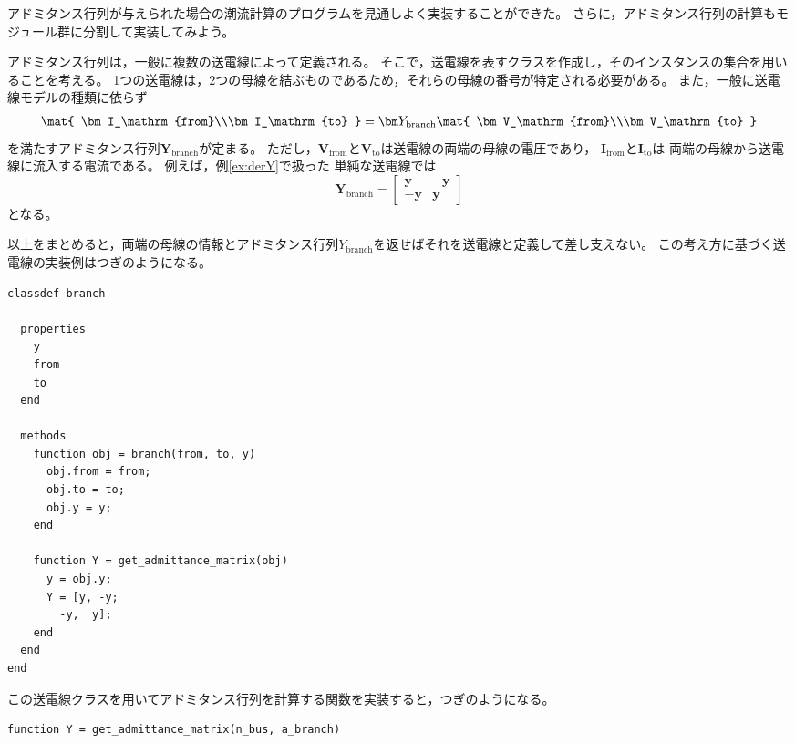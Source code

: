 \documentclass[tombow,dvipdfmx]{corona-a5-1.1}
\begin{document}
アドミタンス行列が与えられた場合の潮流計算のプログラムを見通しよく実装することができた。
さらに，アドミタンス行列の計算もモジュール群に分割して実装してみよう。

\begin{例}[オブジェクト指向によるアドミタンス行列の計算]
アドミタンス行列は，一般に複数の送電線によって定義される。
そこで，送電線を表すクラスを作成し，そのインスタンスの集合を用いることを考える。
1つの送電線は，2つの母線を結ぶものであるため，それらの母線の番号が特定される必要がある。
また，一般に送電線モデルの種類に依らず
\begin{align}
\mat{
\bm I_\mathrm{from}\\\bm I_\mathrm{to}
} =
\bm Y_\mathrm{branch}
\mat{
\bm V_\mathrm{from}\\\bm V_\mathrm{to}
}
\end{align}
を満たすアドミタンス行列$\bm Y_\mathrm{branch}$が定まる。
ただし，$\bm V_\mathrm{from}$と$\bm V_\mathrm{to}$は送電線の両端の母線の電圧であり，
$\bm I_\mathrm{from}$と$\bm I_\mathrm{to}$は
両端の母線から送電線に流入する電流である。
例えば，例\ref{ex:derY}で扱った
単純な送電線では
\[
\bm Y_\mathrm{branch} = \begin{bmatrix}
\bm y & -\bm y\\
-\bm y & \bm y
\end{bmatrix}
\]
となる。

以上をまとめると，両端の母線の情報とアドミタンス行列$Y_\mathrm{branch}$を返せばそれを送電線と定義して差し支えない。
この考え方に基づく送電線の実装例はつぎのようになる。

\smallskip
\begin{PROGRAMA}[count,title={branch.m}]\label{program:branch}
\begin{verbatim}
classdef branch
  
  properties
    y
    from
    to
  end
  
  methods
    function obj = branch(from, to, y)
      obj.from = from;
      obj.to = to;
      obj.y = y;
    end
    
    function Y = get_admittance_matrix(obj)
      y = obj.y;
      Y = [y, -y;
        -y,  y];
    end
  end
end
\end{verbatim}\end{PROGRAMA}

この送電線クラスを用いてアドミタンス行列を計算する関数を実装すると，つぎのようになる。
\smallskip
\begin{PROGRAMA}[count,title={get\_admittance\_matrix.m}]\label{program:admittance}
\begin{verbatim}
function Y = get_admittance_matrix(n_bus, a_branch)


\end{verbatim}
\end{PROGRAMA}
\end{例}
\end{document}
